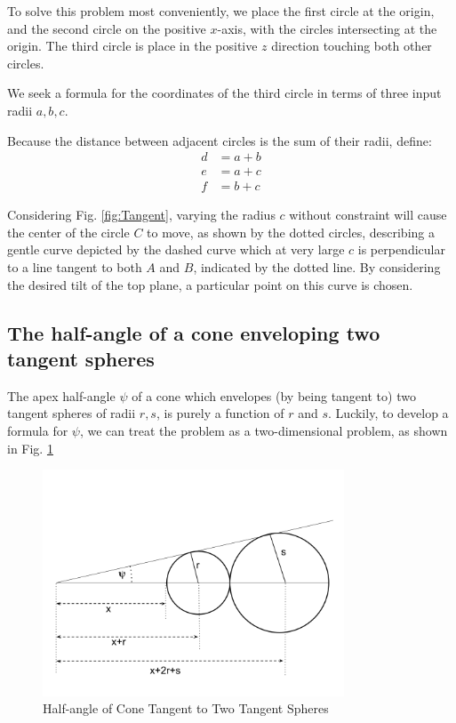 \documentclass{article}
\begin{document}
To solve this problem most conveniently, we place the first circle at the origin, and the second circle
on the positive $x$-axis, with the circles intersecting at the origin.
The third circle is place in the positive $z$ direction touching both other circles.

We seek a formula for the coordinates of the third circle in terms of three input radii $a,b,c$.

Because the distance between adjacent circles is the sum of their radii, define:
\begin{align}
  d  &= a + b \\
  e  &= a + c \\
  f  &= b + c
\end{align}

Considering Fig. \ref{fig:Tangent}, varying the radius $c$ without constraint will cause
the center of the circle $C$ to move, as shown by the dotted circles,
describing a gentle curve depicted by the dashed curve which at very large $c$ is perpendicular to a
line tangent to both $A$ and $B$, indicated by the dotted line.
By considering the desired tilt of the top plane,
a particular point on this curve is chosen.

\subsection{The half-angle of a cone enveloping two tangent spheres}

The apex half-angle $\psi$ of a cone which envelopes (by being tangent to) two tangent
spheres of radii $r,s$, is purely a function of $r$ and $s$.
Luckily, to develop a formula for $\psi$, we can treat the problem as a two-dimensional problem,
as shown in Fig. \ref{fig:conehalf}


\begin{figure}[hbt!]
     \centering
     \includegraphics[width=0.8\textwidth]{figures/HalfAngleOfConeTangenttoTwoTangentSpheres.png}
     \caption{Half-angle of Cone Tangent to Two Tangent Spheres}
  \label{fig:conehalf}
\end{figure}
\end{document}
